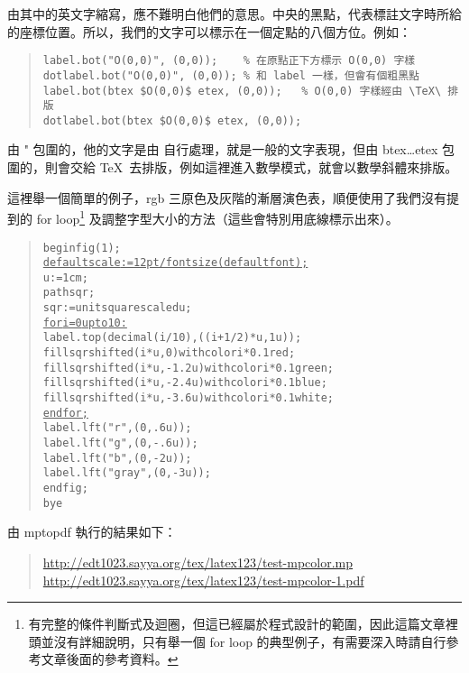\begin{enumerate}
        由其中的英文字縮寫，應不難明白他們的意思。中央的黑點，代表標註文字時所給的座標位置。所以，我們的文字可以標示在一個定點的八個方位。例如：

        \begin{quote}
          \begin{verbatim}
label.bot("O(0,0)", (0,0));    % 在原點正下方標示 O(0,0) 字樣
dotlabel.bot("O(0,0)", (0,0)); % 和 label 一樣，但會有個粗黑點
label.bot(btex $O(0,0)$ etex, (0,0));   % O(0,0) 字樣經由 \TeX\ 排版
dotlabel.bot(btex $O(0,0)$ etex, (0,0));
\end{verbatim}
        \end{quote}

        由 {\ttfamily "} 包圍的，他的文字是由 \MP{} 自行處理，就是一般的文字表現，但由 {\ttfamily btex}\dots{\ttfamily etex} 包圍的，則會交給 \TeX\ 去排版，例如這裡進入數學模式，就會以數學斜體來排版。
\end{enumerate}

這裡舉一個簡單的例子，rgb 三原色及灰階的漸層演色表，順便使用了我們沒有提到的 for loop\footnote{\MP{}
  有完整的條件判斷式及迴圈，但這已經屬於程式設計的範圍，因此這篇文章裡頭並沒有詊細說明，只有舉一個 for loop 的典型例子，有需要深入時請自行參考文章後面的參考資料。}
及調整字型大小的方法（這些會特別用底線標示出來）。

\begin{quote}
  \begin{alltt}
    % test-mpcolor.mp
    beginfig(1);
    \underline{defaultscale := 12pt/fontsize(defaultfont);} % 使用 12 點字
    u := 1cm;
    path sqr;
    sqr := unitsquare scaled u;
    \underline{for i=0 upto 10:}   % for loop 迴圈，請注意這裡是冒號
    label.top(decimal(i/10), ((i+1/2)*u,1u));
    fill sqr shifted (i*u, 0) withcolor i*0.1red;
    fill sqr shifted (i*u, -1.2u) withcolor i*0.1green;
    fill sqr shifted (i*u, -2.4u) withcolor i*0.1blue;
    fill sqr shifted (i*u, -3.6u) withcolor i*0.1white;
    \underline{endfor;}
    label.lft("r", (0,.6u));
    label.lft("g", (0,-.6u));
    label.lft("b", (0,-2u));
    label.lft("gray", (0,-3u));
    endfig;
    bye
  \end{alltt}
\end{quote}

由 {\ttfamily mptopdf} 執行的結果如下：

\begin{quote}
  \url{http://edt1023.sayya.org/tex/latex123/test-mpcolor.mp}\\
  \url{http://edt1023.sayya.org/tex/latex123/test-mpcolor-1.pdf}
\end{quote}

